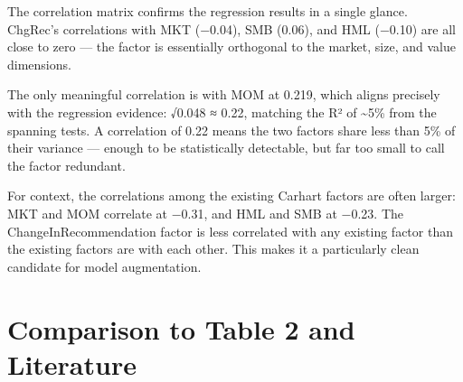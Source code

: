 \documentclass[
  letterpaper,
  DIV=11,
  numbers=noendperiod]{scrartcl}
\begin{document}
The correlation matrix confirms the regression results in a single
glance. ChgRec's correlations with MKT (−0.04), SMB (0.06), and HML
(−0.10) are all close to zero --- the factor is essentially orthogonal
to the market, size, and value dimensions.

The only meaningful correlation is with MOM at 0.219, which aligns
precisely with the regression evidence: √0.048 ≈ 0.22, matching the R²
of \textasciitilde5\% from the spanning tests. A correlation of 0.22
means the two factors share less than 5\% of their variance --- enough
to be statistically detectable, but far too small to call the factor
redundant.

For context, the correlations among the existing Carhart factors are
often larger: MKT and MOM correlate at −0.31, and HML and SMB at −0.23.
The ChangeInRecommendation factor is less correlated with any existing
factor than the existing factors are with each other. This makes it a
particularly clean candidate for model augmentation.

\section{Comparison to Table 2 and
Literature}\label{comparison-to-table-2-and-literature}
\end{document}
